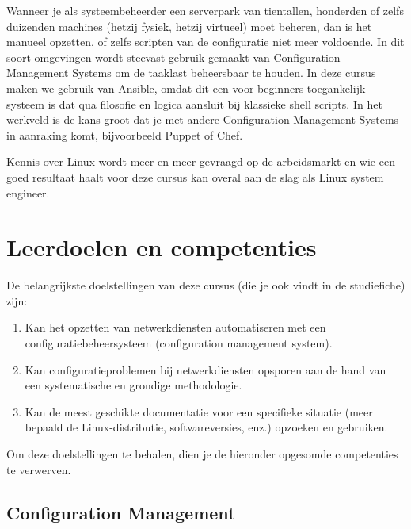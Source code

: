 Wanneer je als systeembeheerder een serverpark van tientallen, honderden of zelfs duizenden machines (hetzij fysiek, hetzij virtueel) moet beheren, dan is het manueel opzetten, of zelfs scripten van de configuratie niet meer voldoende. In dit soort omgevingen wordt steevast gebruik gemaakt van Configuration Management Systems om de taaklast beheersbaar te houden. In deze cursus maken we gebruik van Ansible, omdat dit een voor beginners toegankelijk systeem is dat qua filosofie en logica aansluit bij klassieke shell scripts. In het werkveld is de kans groot dat je met andere Configuration Management Systems in aanraking komt, bijvoorbeeld Puppet of Chef.

Kennis over Linux wordt meer en meer gevraagd op de arbeidsmarkt en wie een goed resultaat haalt voor deze cursus kan overal aan de slag als Linux system engineer.

\section{Leerdoelen en competenties}%
\label{sec:leerdoelen}

De belangrijkste doelstellingen van deze cursus (die je ook vindt in de studiefiche) zijn:

\begin{enumerate}
  \item Kan het opzetten van netwerkdiensten automatiseren met een configuratiebeheersysteem (configuration management system).
  \item Kan configuratieproblemen bij netwerkdiensten opsporen aan de hand van een systematische en grondige methodologie.
  \item Kan de meest geschikte documentatie voor een specifieke situatie (meer bepaald de Linux-distributie, softwareversies, enz.) opzoeken en gebruiken.
\end{enumerate}

Om deze doelstellingen te behalen, dien je de hieronder opgesomde competenties te verwerven.

\subsection{Configuration Management}%
\label{ssec:config-mgmt}

